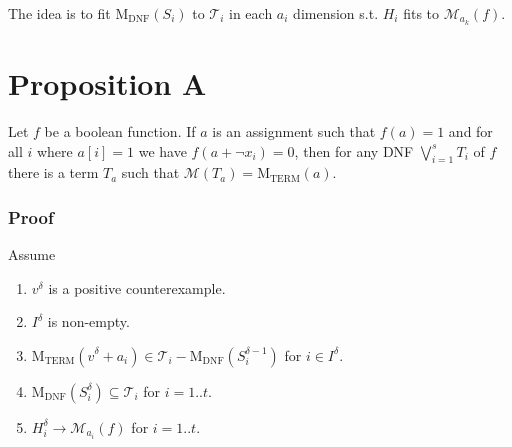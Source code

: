 \documentclass[12pt,a4paper]{llncs}
\newcommand{\cM}{\mathcal{M}}
\newcommand{\cT}{\mathcal{T}}
\newcommand{\MDNF}{\mathrm{M}_\mathrm{DNF}}
\newcommand{\MTERM}{\mathrm{M}_\mathrm{TERM}}
\begin{document}
The idea is to fit $\MDNF(S_i)$ to $\cT_i$
in each $a_i$ dimension s.t.
$H_i$ fits to $\cM_{a_k} ( f )$.

\section*{Proposition A}
Let $f$ be a boolean function. If $a$ is an assignment
such that $f(a) = 1$ and for all $i$ where $a[i] = 1$
we have $f(a + \neg x_i) = 0$,
then for any DNF $\bigvee_{i=1}^s T_i$ of $f$
there is a term $T_a$ such that $\cM(T_a) = \MTERM(a)$.

\subsubsection*{Proof}
Assume
\begin{enumerate}
\item $v^\delta$ is a positive counterexample.
\item $I^\delta$ is non-empty.
\item $\MTERM(\widehat{v}^\delta + a_i) \in \cT_i - \MDNF(S_i^{\delta-1})$ for $i \in I^\delta$.
\item $\MDNF(S_i^\delta) \subseteq \cT_i$ for $i = 1 .. t$.
\item $H_i^\delta \to \cM_{a_i}(f)$ for $i = 1 .. t$.
\end{enumerate}
\end{document}
